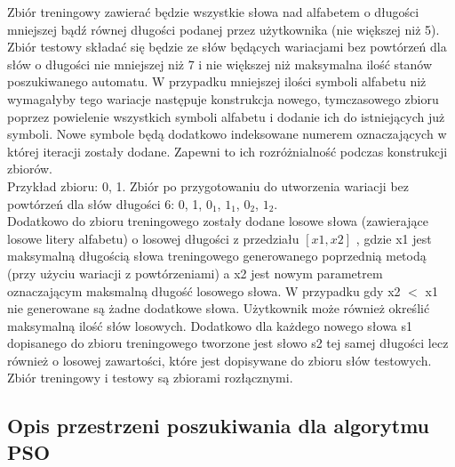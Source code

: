 \documentclass[runningheads,a4paper]{llncs}
\begin{document}
Zbiór treningowy zawierać będzie wszystkie słowa nad alfabetem o długości mniejszej bądź równej długości podanej przez użytkownika (nie większej niż 5). \\

Zbiór testowy składać się będzie ze słów będących wariacjami bez powtórzeń dla słów o  długości nie mniejszej niż 7 i nie większej niż maksymalna ilość stanów poszukiwanego automatu. W przypadku mniejszej ilości symboli alfabetu niż wymagałyby tego wariacje następuje konstrukcja nowego, tymczasowego zbioru poprzez powielenie wszystkich symboli alfabetu i dodanie ich do istniejących już symboli. Nowe symbole będą dodatkowo indeksowane numerem oznaczających w której iteracji zostały dodane. Zapewni to ich rozróżnialność podczas konstrukcji zbiorów.\\

Przykład zbioru: {0, 1}. 
Zbiór po przygotowaniu do utworzenia wariacji bez powtórzeń dla słów długości 6: {0, 1, $0_{1}$, $1_{1}$, $0_{2}$, $1_{2}$}. \\

Dodatkowo do zbioru treningowego zostały dodane losowe słowa (zawierające losowe litery alfabetu) o losowej długości z przedziału $[x1,x2]$ , gdzie x1 jest maksymalną długością słowa treningowego generowanego poprzednią metodą (przy użyciu wariacji z powtórzeniami) a x2 jest nowym parametrem oznaczającym maksmalną długość losowego słowa. W przypadku gdy x2 $<$ x1 nie generowane są żadne dodatkowe słowa. Użytkownik może również określić maksymalną ilość słów losowych. Dodatkowo dla każdego nowego słowa s1 dopisanego do zbioru treningowego tworzone jest słowo s2 tej samej długości lecz również o losowej zawartości, które jest dopisywane do zbioru słów testowych. \\

Zbiór treningowy i testowy są zbiorami rozłącznymi.\\


\subsection{Opis przestrzeni poszukiwania dla algorytmu PSO}
\end{document}

